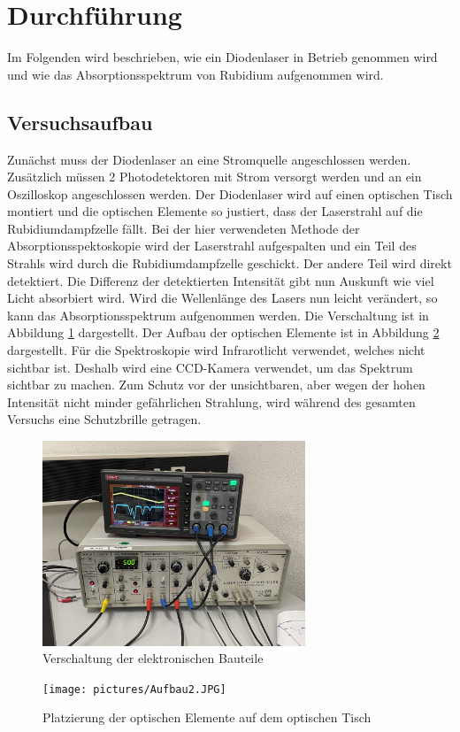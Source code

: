 \section{Durchführung}
\label{sec:Durchführung}
Im Folgenden wird beschrieben, wie ein Diodenlaser in Betrieb genommen wird und wie das Absorptionsspektrum von Rubidium aufgenommen wird.
\subsection{Versuchsaufbau}
Zunächst muss der Diodenlaser an eine Stromquelle angeschlossen werden. Zusätzlich müssen 2 Photodetektoren mit Strom versorgt werden und 
an ein Oszilloskop angeschlossen werden. Der Diodenlaser wird auf einen optischen Tisch montiert und die optischen Elemente so justiert, dass
der Laserstrahl auf die Rubidiumdampfzelle fällt. Bei der hier verwendeten Methode der Absorptionsspektoskopie wird der Laserstrahl aufgespalten
und ein Teil des Strahls wird durch die Rubidiumdampfzelle geschickt. Der andere Teil wird direkt detektiert. Die Differenz der detektierten Intensität 
gibt nun Auskunft wie viel Licht absorbiert wird. Wird die Wellenlänge des Lasers nun leicht verändert, so kann das Absorptionsspektrum aufgenommen werden.
Die Verschaltung ist in Abbildung \ref{fig:versuchsaufbau} dargestellt. Der Aufbau der optischen Elemente ist in Abbildung \ref{fig:optische_elemente} dargestellt.
Für die Spektroskopie wird Infrarotlicht verwendet, welches nicht sichtbar ist. Deshalb wird eine CCD-Kamera verwendet, um das Spektrum sichtbar zu machen.
Zum Schutz vor der unsichtbaren, aber wegen der hohen Intensität nicht minder gefährlichen Strahlung, wird während des gesamten Versuchs eine Schutzbrille getragen.
\begin{figure}[H]
    \centering
    \includegraphics[width=0.7\textwidth]{pictures/Aufbau.JPG}
    \caption{Verschaltung der elektronischen Bauteile}
    \label{fig:versuchsaufbau}
\end{figure}
\begin{figure}[H]
    \centering
    \texttt{[image: pictures/Aufbau2.JPG]}
    \caption{Platzierung der optischen Elemente auf dem optischen Tisch}
    \label{fig:optische_elemente}
\end{figure}
